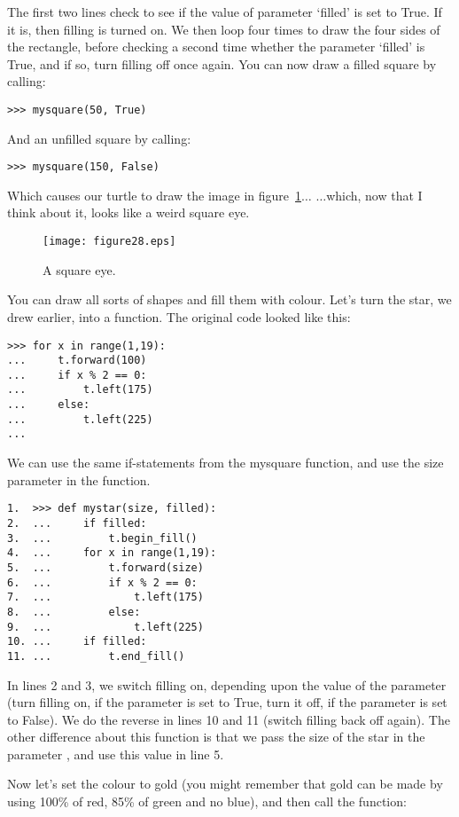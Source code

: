 The first two lines check to see if the value of parameter `filled' is set to True. If it is, then filling is turned on.  We then loop four times to draw the four sides of the rectangle, before checking a second time whether the parameter `filled' is True, and if so, turn filling off once again. You can now draw a filled square by calling:

\begin{Verbatim}[frame=single]
>>> mysquare(50, True)
\end{Verbatim}

\noindent
And an unfilled square by calling:

\begin{Verbatim}[frame=single]
>>> mysquare(150, False)
\end{Verbatim}

\noindent
Which causes our turtle to draw the image in figure~\ref{fig28}$\ldots$ $\ldots$which, now that I think about it, looks like a weird square eye.

\begin{figure}
\begin{center}
\texttt{[image: figure28.eps]}
\end{center}
\caption{A square eye.}\label{fig28}
\end{figure}

You can draw all sorts of shapes and fill them with colour. Let's turn the star, we drew earlier, into a function. The original code looked like this:

\begin{Verbatim}[frame=single]
>>> for x in range(1,19):
...     t.forward(100)
...     if x % 2 == 0:
...         t.left(175)
...     else:
...         t.left(225)
...
\end{Verbatim}

We can use the same if-statements from the mysquare function, and use the size parameter in the  function.

\begin{Verbatim}[frame=single]
1.  >>> def mystar(size, filled):
2.  ...     if filled:
3.  ...         t.begin_fill()
4.  ...     for x in range(1,19):
5.  ...         t.forward(size)
6.  ...         if x % 2 == 0:
7.  ...             t.left(175)
8.  ...         else:
9.  ...             t.left(225)
10. ...     if filled:
11. ...         t.end_fill()
\end{Verbatim}

In lines 2 and 3, we switch filling on, depending upon the value of the parameter  (turn filling on, if the parameter is set to True, turn it off, if the parameter is set to False).  We do the reverse in lines 10 and 11 (switch filling back off again).  The other difference about this function is that we pass the size of the star in the parameter , and use this value in line 5.
\par
Now let's set the colour to gold (you might remember that gold can be made by using 100\% of red, 85\% of green and no blue), and then call the function:

